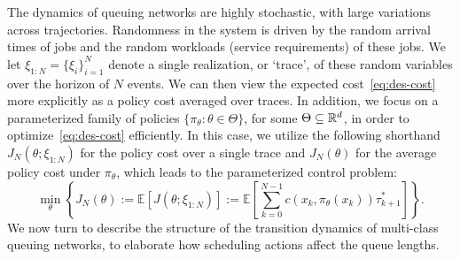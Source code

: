 The dynamics of queuing networks are highly stochastic, with large variations across trajectories. Randomness in the system is driven by the random arrival times of jobs and the random workloads (service requirements) of these jobs.  We let $\xi_{1:N}=\{\xi_{i}\}_{i=1}^{N}$ denote a single realization, or `trace', of these random variables over the horizon of $N$ events.
We can then view the expected cost~\eqref{eq:des-cost} more explicitly as a policy cost averaged over traces. 
In addition, we focus on a parameterized family of policies $\{\pi_{\theta}:\theta\in\Theta\}$, for some $\Theta\subseteq\mathbb{R}^{d}$, in order to optimize~\eqref{eq:des-cost} efficiently. In this case, we utilize the following shorthand $J_N(\theta;\xi_{1:N})$ for the
policy cost over a single trace and $J_N(\theta)$ for the average policy
cost under $\pi_{\theta}$,
which leads to the parameterized control problem:
\begin{equation}
\min_{\theta}
\left\{J_{N}(\theta) := \mathbb{E}\left[J(\theta;\xi_{1:N})\right]
:= 
\mathbb{E}\left[\sum_{k=0}^{N-1}c(x_{k},\pi_{\theta}(x_{k}))\tau^{*}_{k+1}\right]
\right\}.
\label{eq:param-cost}
\end{equation}
We now turn to describe the structure of the transition dynamics of multi-class queuing networks, to elaborate how scheduling actions affect the queue lengths.


